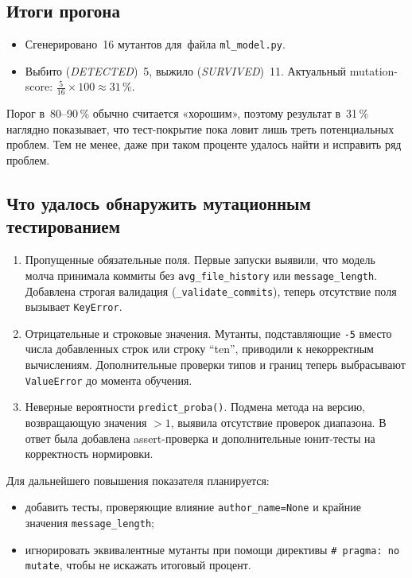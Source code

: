 \vspace{0.7em}
\subsection{Итоги прогона}

\begin{itemize}
	\item Сгенерировано~16 мутантов для~файла \texttt{ml\_model.py}.
	\item Выбито (\textit{DETECTED})~5, выжило (\textit{SURVIVED})~11.  
	Актуальный mutation-score: $\frac{5}{16}\!\times\!100 \approx 31\,\%$.
\end{itemize}

Порог в~80--90\,\% обычно считается «хорошим»,
поэтому результат в~31\,\% наглядно показывает,
что тест-покрытие пока ловит лишь треть потенциальных проблем.
Тем не менее, даже при таком проценте удалось найти и исправить ряд проблем.

\vspace{0.7em}
\subsection{Что удалось обнаружить мутационным тестированием}

\begin{enumerate}
	\item Пропущенные обязательные поля.
	Первые запуски выявили, что модель молча принимала коммиты без
	\verb|avg_file_history| или \verb|message_length|.  
	Добавлена строгая валидация (\verb|_validate_commits|),
	теперь отсутствие поля вызывает \verb|KeyError|.
	
	\item Отрицательные и строковые значения.
	Мутанты, подставляющие \verb|-5| вместо числа добавленных строк
	или строку ``ten'', приводили к некорректным вычислениям.
	Дополнительные проверки типов и границ теперь
	выбрасывают \verb|ValueError| до момента обучения.
	
	\item Неверные вероятности \texttt{predict\_proba()}.
	Подмена метода на версию, возвращающую значения $>1$,
	выявила отсутствие проверок диапазона.  
	В ответ была добавлена assert-проверка и дополнительные
	юнит-тесты на корректность нормировки.
\end{enumerate}

Для дальнейшего повышения показателя планируется:

\begin{itemize}
	\item добавить тесты, проверяющие влияние
	\verb|author_name=None| и крайние значения \verb|message_length|;
	\item игнорировать эквивалентные мутанты при помощи директивы
	\texttt{\# pragma: no mutate}, чтобы не искажать итоговый процент.
\end{itemize}

